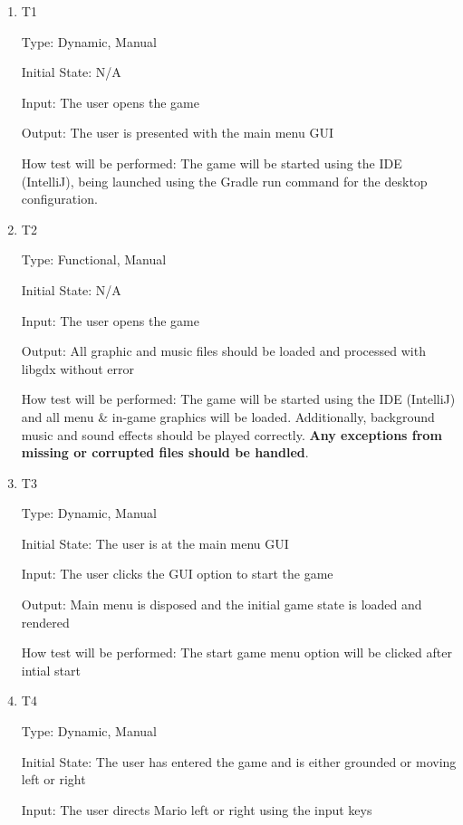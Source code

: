 \documentclass[12pt, titlepage]{article}
\begin{document}
\begin{enumerate}

\item{T1\\}

Type: Dynamic, Manual
					
Initial State: N/A
					
Input: The user opens the game
					
Output: The user is presented with the main menu GUI
					
How test will be performed: The game will be started using the IDE (IntelliJ), being launched using the Gradle run command for the desktop configuration.

\item{T2\\}

Type: Functional, Manual
					
Initial State: N/A
					
Input: The user opens the game
					
Output: All graphic and music files should be loaded and processed with libgdx without error
					
How test will be performed: The game will be started using the IDE (IntelliJ) and all menu \& in-game graphics will be loaded. Additionally, background music and sound effects should be played correctly. \textbf{Any exceptions from missing or corrupted files should be handled}.
					
\item{T3\\}

Type: Dynamic, Manual
					
Initial State: The user is at the main menu GUI
					
Input: The user clicks the GUI option to start the game
					
Output: Main menu is disposed and the initial game state is loaded and rendered
					
How test will be performed: The start game menu option will be clicked after intial start

\item{T4\\}

Type: Dynamic, Manual
					
Initial State: The user has entered the game and is either grounded or moving left or right
					
Input: The user directs Mario left or right using the input keys
					

\end{enumerate}
\end{document}

